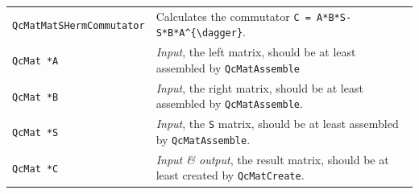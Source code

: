 \documentclass[a4paper,11pt,twoside,openright]{book}
\begin{document}
\begin{center}
\begin{longtable}{l|p{}}
    \hline
%
    \verb|QcMatMatSHermCommutator|\index{\texttt{QcMatMatSHermCommutator}} %
      & Calculates the commutator \verb|C = A*B*S-S*B*A^{\dagger}|.\\
    \hspace*{2ex}\verb|QcMat *A| %
      & \textsl{Input}, the left matrix, should be at least assembled
        by \verb|QcMatAssemble|\\
    \hspace*{2ex}\verb|QcMat *B| %
      & \textsl{Input}, the right matrix, should be at least assembled
        by \verb|QcMatAssemble|.\\
    \hspace*{2ex}\verb|QcMat *S| %
      & \textsl{Input}, the \verb|S| matrix, should be at least assembled
        by \verb|QcMatAssemble|.\\
    \hspace*{2ex}\verb|QcMat *C| %
      & \textsl{Input \& output}, the result matrix, should be at least created
        by \verb|QcMatCreate|.
%
  \end{longtable}
\end{center}
\vspace*{-5ex}
\end{document}
